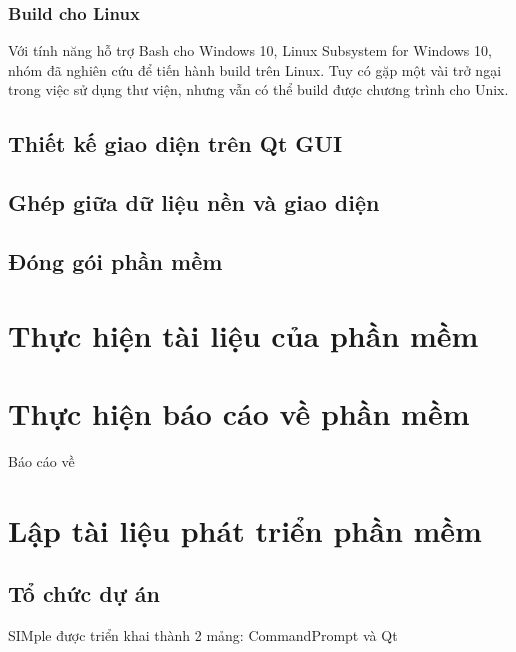 \documentclass[12pt,a4paper]{report}
\begin{document}
			\subsubsection{Build cho Linux}

			Với tính năng hỗ trợ Bash cho Windows 10, Linux Subsystem for Windows 10, nhóm đã nghiên cứu để tiến hành build trên Linux. Tuy có gặp một vài trở ngại trong việc sử dụng thư viện, nhưng vẫn có thể build được chương trình cho Unix.
		\subsection{Thiết kế giao diện trên Qt GUI}
		\subsection{Ghép giữa dữ liệu nền và giao diện}
		\subsection{Đóng gói phần mềm}
	\section{Thực hiện tài liệu của phần mềm}
	\section{Thực hiện báo cáo về phần mềm}
		Báo cáo về
	\section{Lập tài liệu phát triển phần mềm}
		\subsection{Tổ chức dự án}
		SIMple được triển khai thành 2 mảng: CommandPrompt và Qt
\end{document}
